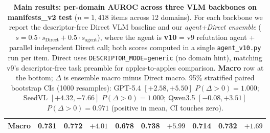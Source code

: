 \begin{table}[t]
\begin{tabular}{l|ccc|ccc|ccc}
\midrule
\textbf{Macro}                & \textbf{0.731} & \textbf{0.772} & $\mathbf{+4.01}$ & \textbf{0.678} & \textbf{0.738} & $\mathbf{+5.99}$ & \textbf{0.714} & \textbf{0.732} & $\mathbf{+1.69}$ \\
\bottomrule
\end{tabular}
\caption{\textbf{Main results: per-domain AUROC across three VLM backbones on manifests_v2 test} ($n{=}1{,}418$ items across 12 domains). For each backbone we report the descriptor-free Direct VLM baseline and our \emph{agent+Direct ensemble} ($s = 0.5\!\cdot\!s_{\mathrm{Direct}} + 0.5\!\cdot\!s_{\mathrm{agent}}$), where the agent is \textbf{v10} = v9 refutation agent + parallel independent Direct call; both scores computed in a single \texttt{agent\_v10.py} run per item. Direct uses \texttt{DESCRIPTOR\_MODE=generic} (no domain hint), matching v9's descriptor-free task preamble for apples-to-apples comparison. \textbf{Macro} row at the bottom; $\Delta$ is ensemble macro minus Direct macro. 95\% stratified paired bootstrap CIs (1000 resamples): GPT-5.4 $[+2.58, +5.50]$ $P(\Delta{>}0){=}1.000$; SeedVL $[+4.32, +7.66]$ $P(\Delta{>}0){=}1.000$; Qwen3.5 $[-0.08, +3.51]$ $P(\Delta{>}0){=}0.971$ (positive in mean, CI touches zero).}
\label{tab:main_results}
\end{table}

%

